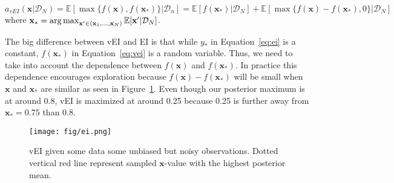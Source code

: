 \begin{definition}[vEI]
    \begin{equation}
        \label{eq:vei}
        a_{vEI}(\mathbf{x} | \mathcal{D}_N) = \mathbb{E}[\max \{ f(\mathbf{x}), f(\mathbf{x}_*) \} | \mathcal{D}_n]
        = \mathbb{E}[f(\mathbf{x}_*) | \mathcal{D}_N] + \mathbb{E}[\max \{ f(\mathbf{x}) - f(\mathbf{x}_*), 0 \} | \mathcal{D}_N]
    \end{equation}
    where $\mathbf{x}_* = \operatorname*{arg\,max}_{\mathbf{x'} \in (\mathbf{x}_1, \dots, \mathbf{x}_N)} \mathbb{E}[\mathbf{x'} | \mathcal{D}_N]$.
\end{definition}

The big difference between vEI and EI is that while $y_*$ in Equation~\ref{eq:ei} is a constant, $f(\mathbf{x}_*)$ in Equation~\ref{eq:vei} is a random variable.
Thus, we need to take into account the dependence between $f(\mathbf{x})$ and $f(\mathbf{x}_*)$.
In practice this dependence encourages exploration because $f(\mathbf{x}) - f(\mathbf{x}_*)$ will be small when $\mathbf{x}$ and $\mathbf{x}_*$ are similar as seen in Figure~\ref{fig:ei}.
Even though our posterior maximum is at around 0.8, vEI is maximized at around 0.25 because 0.25 is further away from $\mathbf{x}_* = 0.75$ than 0.8.

\begin{figure}[t]
    \centering
    \texttt{[image: fig/ei.png]}
    \caption{vEI given some data some unbiased but noisy observations.
        Dotted vertical red line represent sampled $\mathbf{x}$-value with the highest posterior mean.
    }
    \label{fig:ei}
\end{figure}

